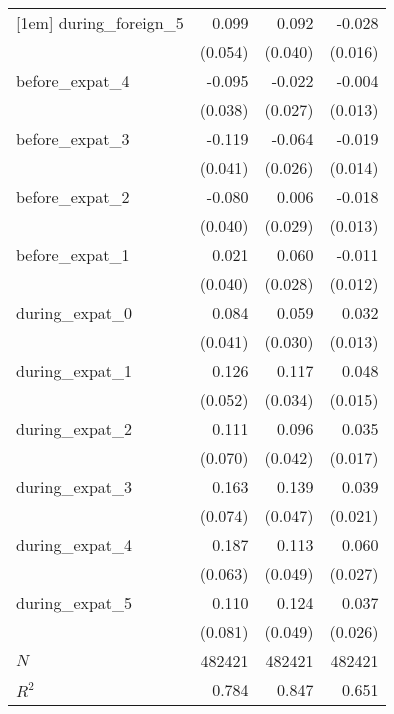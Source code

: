 {\begin{tabular}{l*{3}{D{.}{.}{-1}}}
[1em]
during\_foreign\_5&       0.099\sym{*}  &       0.092\sym{**} &      -0.028\sym{*}  \\
            &     (0.054)         &     (0.040)         &     (0.016)         \\
[1em]
before\_expat\_4&      -0.095\sym{**} &      -0.022         &      -0.004         \\
            &     (0.038)         &     (0.027)         &     (0.013)         \\
[1em]
before\_expat\_3&      -0.119\sym{***}&      -0.064\sym{**} &      -0.019         \\
            &     (0.041)         &     (0.026)         &     (0.014)         \\
[1em]
before\_expat\_2&      -0.080\sym{**} &       0.006         &      -0.018         \\
            &     (0.040)         &     (0.029)         &     (0.013)         \\
[1em]
before\_expat\_1&       0.021         &       0.060\sym{**} &      -0.011         \\
            &     (0.040)         &     (0.028)         &     (0.012)         \\
[1em]
during\_expat\_0&       0.084\sym{**} &       0.059\sym{*}  &       0.032\sym{**} \\
            &     (0.041)         &     (0.030)         &     (0.013)         \\
[1em]
during\_expat\_1&       0.126\sym{**} &       0.117\sym{***}&       0.048\sym{***}\\
            &     (0.052)         &     (0.034)         &     (0.015)         \\
[1em]
during\_expat\_2&       0.111         &       0.096\sym{**} &       0.035\sym{**} \\
            &     (0.070)         &     (0.042)         &     (0.017)         \\
[1em]
during\_expat\_3&       0.163\sym{**} &       0.139\sym{***}&       0.039\sym{*}  \\
            &     (0.074)         &     (0.047)         &     (0.021)         \\
[1em]
during\_expat\_4&       0.187\sym{***}&       0.113\sym{**} &       0.060\sym{**} \\
            &     (0.063)         &     (0.049)         &     (0.027)         \\
[1em]
during\_expat\_5&       0.110         &       0.124\sym{**} &       0.037         \\
            &     (0.081)         &     (0.049)         &     (0.026)         \\
\hline
\(N\)       &      482421         &      482421         &      482421         \\
\(R^{2}\)   &       0.784         &       0.847         &       0.651         \\
\hline\hline
\end{tabular}
}
